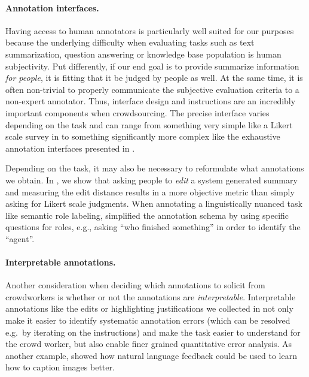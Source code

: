 \paragraph{Annotation interfaces.}
Having access to human annotators is particularly well suited for our purposes because the underlying difficulty when evaluating tasks such as text summarization, question answering or knowledge base population is human subjectivity.
Put differently, if our end goal is to provide summarize information \textit{for people}, it is fitting that it be judged by people as well.
At the same time, it is often non-trivial to properly communicate the subjective evaluation criteria to a non-expert annotator.
Thus, interface design and instructions are an incredibly important components when crowdsourcing.
The precise interface varies depending on the task and can range from something very simple like a Likert scale survey in  to something significantly more complex like the exhaustive annotation interfaces presented in .

Depending on the task, it may also be necessary to reformulate what annotations we obtain.
In , we show that asking people to \textit{edit} a system generated summary and measuring the edit distance results in a more objective metric than simply asking for Likert scale judgments.
When annotating a linguistically nuanced task like semantic role labeling, \citet{he2015question} simplified the annotation schema by using specific questions for roles, e.g., asking ``who finished something'' in order to identify the ``agent''.

\paragraph{Interpretable annotations.}
Another consideration when deciding which annotations to solicit from crowdworkers is whether or not the annotations are \textit{interpretable}.
Interpretable annotations like the edits or highlighting justifications we collected in  not only make it easier to identify systematic annotation errors (which can be resolved e.g.\ by iterating on the instructions) and make the task easier to understand for the crowd worker, but also enable finer grained quantitative error analysis.
As another example, \citet{ling2017teaching} showed how natural language feedback could be used to learn how to caption images better.

